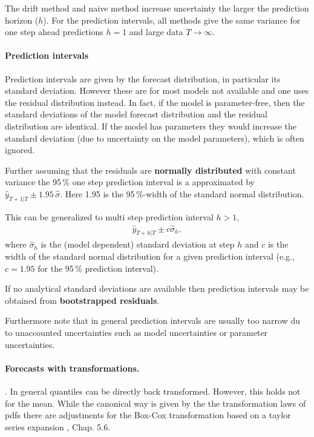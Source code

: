 \documentclass[12pt,a4paper]{article}
\begin{document}
The drift method and naive method increase uncertainty the larger the prediction horizon ($h$).
For the prediction intervals, all methods give the same variance for one step ahead predictions $h=1$ and large data $T\rightarrow \infty$.


\paragraph{Prediction intervals}
Prediction intervals are given by the forecast distribution, in particular its standard deviation. However these are for most models not available and one uses the residual distribution instead. In fact, if the model is parameter-free, then the standard deviations of the model forecast distribution and the residual distribution are identical. If the model has parameters they would increase the standard deviation (due to uncertainty on the model parameters), which is often ignored. 

Further assuming that the residuals are \textbf{normally distributed} with constant variance the 95\,\% one step prediction interval is a approximated by $\hat y_ {T+1 | T} \pm 1.95\,\hat \sigma$. Here 1.95 is the 95\,\%-width of the standard normal distribution.

This can be generalized to multi step prediction interval $h > 1$,   
\begin{align}\label{eq:gauss_prediction_error}
	\hat y_ {T+h | T} \pm c\hat \sigma_h, 
\end{align}
where $\hat \sigma_h$ is the (model dependent) standard deviation at step $h$ and $c$ is the width of the standard normal distribution for a given prediction interval (e.g., $c=1.95$ for the 95\,\% prediction interval).

If no analytical standard deviations are available then prediction intervals may be obtained from \textbf{bootstrapped residuals}.

Furthermore note that in general prediction intervals are usually too narrow du to unaccounted uncertainties such as model uncertainties or parameter uncertainties.

\paragraph{Forecasts with transformations.}. In general quantiles can be directly back transformed. However, this holds not for the mean. While the canonical way is given by the the transformation laws of pdfs there are adjustments for the Box-Cox transformation based on a taylor series expansion \cite{hyndman_forecasting_principles_2018}, Chap. 5.6.
\end{document}
